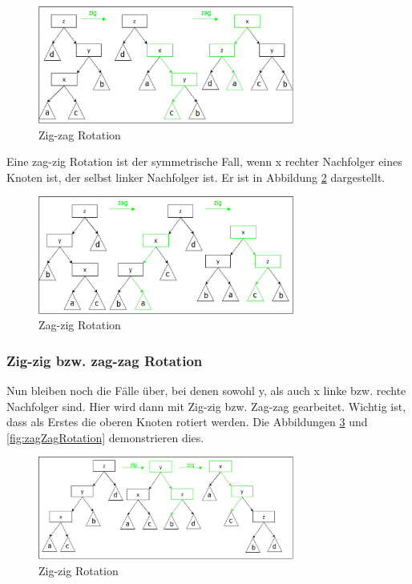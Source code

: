 \documentclass[11pt, a4paper]{article}
\begin{document}
	\begin{figure}[h]
		\centering
		\includegraphics[width=0.75\textwidth]{"bilder/zigZagRotation"}
		\caption{Zig-zag Rotation}
		\label{fig:zigZagRotation}
	\end{figure}

	\noindent Eine zag-zig Rotation ist der symmetrische Fall, wenn x rechter Nachfolger eines Knoten ist, der selbst linker Nachfolger  ist. Er ist in Abbildung \ref{fig:zagZigRotation} dargestellt.
		\begin{figure}[h]
		\centering
		\includegraphics[width=0.75\textwidth]{"bilder/zagZigRotation"}
		\caption{Zag-zig Rotation}
		\label{fig:zagZigRotation}
	\end{figure}

	\subsubsection{Zig-zig bzw. zag-zag Rotation }
	
	Nun bleiben noch die Fälle über, bei denen sowohl y, als auch x linke bzw. rechte Nachfolger
	sind. Hier wird dann mit Zig-zig bzw. Zag-zag gearbeitet. Wichtig ist, dass als Erstes die oberen Knoten rotiert werden. Die Abbildungen   \ref{fig:zigZigRotation}  und \ref{fig:zagZagRotation} demonstrieren dies.
	
	\begin{figure}[h]
		\centering
		\includegraphics[width=0.75\textwidth]{"bilder/zigZigRotation"}
		\caption{Zig-zig Rotation}
		\label{fig:zigZigRotation}
	\end{figure}
	
\end{document}
